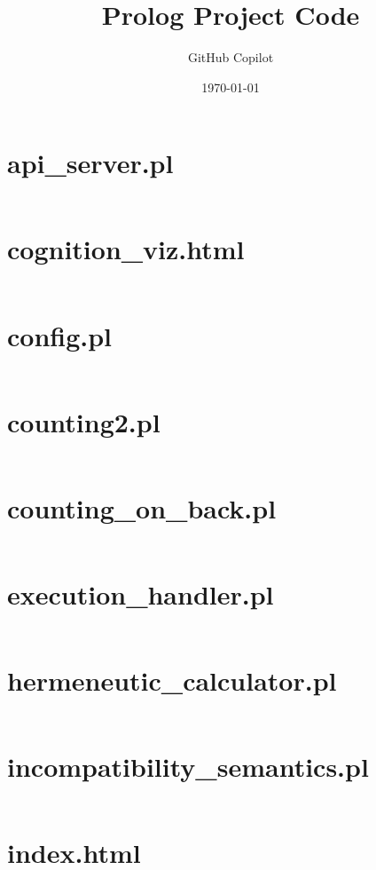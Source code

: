 \documentclass{article}
\title{Prolog Project Code}
\author{GitHub Copilot}
\date{\today}
\begin{document}
\maketitle
\tableofcontents
\newpage

\section{api\_server.pl}
\inputminted{prolog}{api_server.pl}

\section{cognition\_viz.html}
\inputminted{html}{cognition_viz.html}

\section{config.pl}
\inputminted{prolog}{config.pl}

\section{counting2.pl}
\inputminted{prolog}{counting2.pl}

\section{counting\_on\_back.pl}
\inputminted{prolog}{counting_on_back.pl}

\section{execution\_handler.pl}
\inputminted{prolog}{execution_handler.pl}

\section{hermeneutic\_calculator.pl}
\inputminted{prolog}{hermeneutic_calculator.pl}

\section{incompatibility\_semantics.pl}
\inputminted{prolog}{incompatibility_semantics.pl}

\section{index.html}
\inputminted{html}{index.html}
\end{document}
